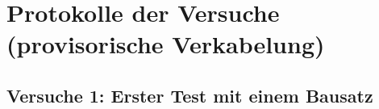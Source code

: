 \documentclass[draft=false
              ,paper=a4
              ,twoside=false
              ,fontsize=10pt
              ,headsepline
              ,BCOR10mm
              ,DIV11
              ]{article}
\renewcommand{\contentsname}%
    {OUTLINE}%
\renewcommand{\listfigurename}%
  	{List of figures}
\begin{document}
\newpage
\renewcommand*\contentsname{Inhaltsverzeichnis}
\tableofcontents
\vspace{3cm}
\renewcommand{\listfigurename}{Abbildungsverzeichnis}
\listoffigures
{}

\newpage
\section{Protokolle der Versuche (provisorische Verkabelung)}
\subsection{Versuche 1: Erster Test mit einem Bausatz}
\end{document}
